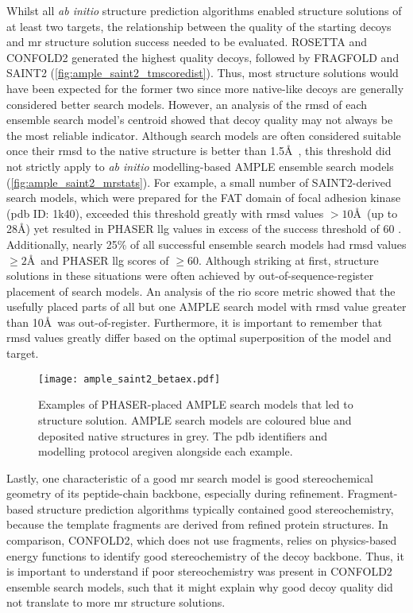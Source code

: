 Whilst all \textit{ab initio} structure prediction algorithms enabled structure solutions of at least two targets, the relationship between the quality of the starting decoys and \gls{mr} structure solution success needed to be evaluated. ROSETTA and CONFOLD2 generated the highest quality decoys, followed by FRAGFOLD and SAINT2 (\cref{fig:ample_saint2_tmscoredist}). Thus, most structure solutions would have been expected for the former two since more native-like decoys are generally considered better search models. However, an analysis of the \gls{rmsd} of each ensemble search model's centroid showed that decoy quality may not always be the most reliable indicator. Although search models are often considered suitable once their \gls{rmsd} to the native structure is better than 1.5\AA\ \cite{Scapin2013-yp}, this threshold did not strictly apply to \textit{ab initio} modelling-based AMPLE ensemble search models (\cref{fig:ample_saint2_mrstats}). For example, a small number of SAINT2-derived search models, which were prepared for the FAT domain of focal adhesion kinase (\gls{pdb} ID: 1k40), exceeded this threshold greatly with \gls{rmsd} values $>10$\AA\ (up to 28\AA) yet resulted in PHASER \gls{llg} values in excess of the success threshold of 60 \cite{Oeffner2018-ur}. Additionally, nearly 25\% of all successful ensemble search models had \gls{rmsd} values $\geq2$\AA\ and PHASER \gls{llg} scores of $\geq$60. Although striking at first, structure solutions in these situations were often achieved by out-of-sequence-register placement of search models. An analysis of the \gls{rio} score metric showed that the usefully placed parts of all but one AMPLE search model with \gls{rmsd} value greater than 10\AA\ was out-of-register. Furthermore, it is important to remember that \gls{rmsd} values greatly differ based on the optimal superposition of the model and target.

\begin{figure}[H]
    \centering
    \texttt{[image: ample\_saint2\_betaex.pdf]}
    \caption[Examples of PHASER-placed AMPLE search models]{Examples of PHASER-placed AMPLE search models that led to structure solution. AMPLE search models are coloured blue and deposited native structures in grey. The \gls{pdb} identifiers and modelling protocol aregiven alongside each example.}
    \label{fig:ample_saint2_betaex}
\end{figure}

Lastly, one characteristic of a good \gls{mr} search model is good stereochemical geometry of its peptide-chain backbone, especially during refinement. Fragment-based structure prediction algorithms typically contained good stereochemistry, because the template fragments are derived from refined protein structures. In comparison, CONFOLD2, which does not use fragments, relies on physics-based energy functions to identify good stereochemistry of the decoy backbone. Thus, it is important to understand if poor stereochemistry was present in CONFOLD2 ensemble search models, such that it might explain why good decoy quality did not translate to more \gls{mr} structure solutions.

